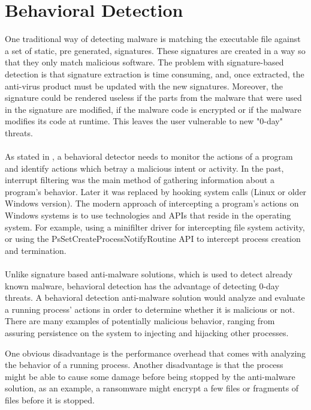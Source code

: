     \pagebreak
    
    \section{Behavioral Detection}
        One traditional way of detecting malware is matching the executable file against a set of static, pre generated, signatures. These
        signatures are created in a way so that they only match malicious software\cite{ASADMATT}. The problem with signature-based detection
        is that signature extraction is time consuming, and, once extracted, the anti-virus product must be updated with the new signatures.
        Moreover, the signature could be rendered useless if the parts from the malware that were used in the signature are modified, if
        the malware code is encrypted or if the malware modifies its code at runtime. This leaves the user vulnerable to new "0-day" threats. 

        \paragraph{}
        As stated in , a behavioral detector needs to monitor the actions of a program and identify actions
        which betray a malicious intent or activity. In the past, interrupt filtering was the main method of gathering information about a
        program's behavior. Later it was replaced by hooking system calls (Linux or older Windows version). The modern approach of intercepting
        a program's actions on Windows systems is to use technologies and APIs that reside in the operating system. For example, using a
        minifilter driver for intercepting file system activity, or using the PsSetCreateProcessNotifyRoutine API to intercept process
        creation and termination.

        \paragraph{}
        Unlike signature based anti-malware solutions, which is used to detect already known malware, behavioral detection has the advantage of
        detecting 0-day threats. A behavioral detection anti-malware solution would analyze and evaluate a running process' actions in order to
        determine whether it is malicious or not. There are many examples of potentially malicious behavior, ranging from assuring persistence on
        the system to injecting and hijacking other processes.

        One obvious disadvantage is the performance overhead that comes with analyzing the behavior of a running process. Another disadvantage is
        that the process might be able to cause some damage before being stopped by the anti-malware solution, as an example, a ransomware might
        encrypt a few files or fragments of files before it is stopped.
        